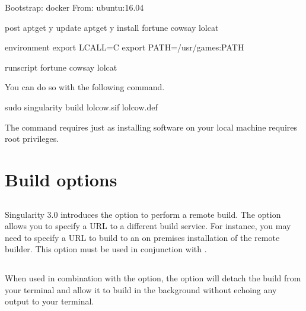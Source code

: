 \documentclass[letterpaper,10pt,english]{sphinxmanual}
\begin{document}
%
\begin{sphinxVerbatim}[commandchars=\\\{\}]
Bootstrap: docker
From: ubuntu:16.04

\PYGZpc{}post
    apt\PYGZhy{}get \PYGZhy{}y update
    apt\PYGZhy{}get \PYGZhy{}y install fortune cowsay lolcat

\PYGZpc{}environment
    export LC\PYGZus{}ALL=C
    export PATH=/usr/games:\PYGZdl{}PATH

\PYGZpc{}runscript
    fortune \textbar{} cowsay \textbar{} lolcat
\end{sphinxVerbatim}

You can do so with the following command.

%
\begin{sphinxVerbatim}[commandchars=\\\{\}]
\PYGZdl{} sudo singularity build lolcow.sif lolcow.def
\end{sphinxVerbatim}

The command requires  just as installing software on your local machine
requires root privileges.


\section{Build options}
\label{\detokenize{build_a_container:build-options}}

\subsection{}
\label{\detokenize{build_a_container:builder}}
Singularity 3.0 introduces the option to perform a remote build. The
 option allows you to specify a URL to a different build service.
For instance, you may need to specify a URL to build to an on premises
installation of the remote builder.  This option must be used in conjunction
with .


\subsection{}
\label{\detokenize{build_a_container:detached}}
When used in combination with the  option, the  option
will detach the build from your terminal and allow it to build in the background
without echoing any output to your terminal.
\end{document}
